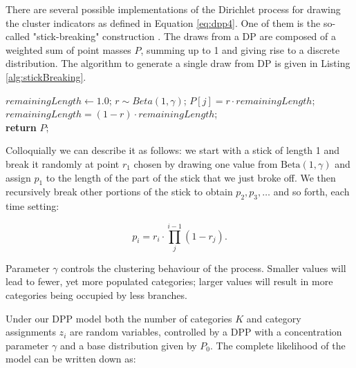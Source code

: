 There are several possible implementations of the Dirichlet process for drawing the cluster indicators as defined in Equation \ref{eq:dpp4}. 
One of them is the so-called "stick-breaking" construction \citep{Sethuraman94}.
The draws from a DP are composed of a weighted sum of point masses $P$, summing up to 1 and giving rise to a discrete distribution.
The algorithm to generate a single draw from DP is given in Listing \ref{alg:stickBreaking}.

\begin{algorithm}[H]
\begin{center}
\begin{algorithmic}[1]
%
\State $remainingLength \gets 1.0$;
%
%
\State $r\sim Beta\left(1,\gamma\right)$;
%
\State $P\left[j\right]=r \cdot remainingLength$;
%
\State $remainingLength=\left(1-r\right) \cdot remainingLength$;
%
\EndFor \\
%
 \textbf{return} $P$;
\end{algorithmic}
\end{center}
\caption{ 
{ \footnotesize 
{\bf Constructing the Dirichlet process by stick breaking.} 
}%
}
\label{alg:stickBreaking}
\end{algorithm}

Colloquially we can describe it as follows: we start with a stick of length 1 and break it randomly at point $r_{1}$ chosen by drawing one value from $\text{Beta}(1, \gamma)$ and assign $p_{1}$ to the length of the part of the stick that we just broke off.
We then recursively break other portions of the stick to obtain $p_{2}, p_{3}, \ldots$ and so forth, each time setting:

\begin{equation}
p_{i}=r_{i}\cdot\underset{j}{\overset{i-1}{\prod}}\left(1-r_{j}\right).
\label{eq:sticks}
\end{equation}

\noindent
Parameter $\gamma$ controls the clustering behaviour of the process.
Smaller values will lead to fewer, yet more populated categories; larger values will result in more categories being occupied by less branches.

Under our DPP model both the number of categories $K$ and category assignments $z_{i}$ are random variables, controlled by a DPP with a concentration parameter $\gamma$ and a base distribution given by $P_{0}$.
The complete likelihood of the model can be written down as:

